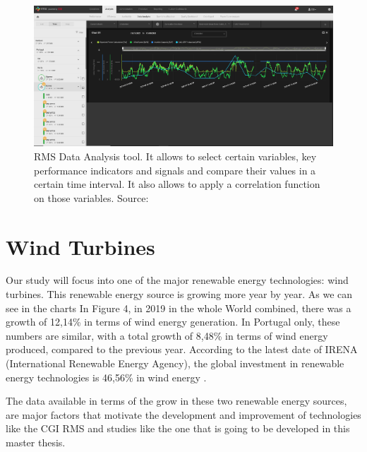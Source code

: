 \begin{figure}[htbp]
	\centering
	\includegraphics[width=\textwidth]{Chapters/Figures/background_fig3.PNG}
	\caption{RMS Data Analysis tool. It allows to select certain variables, key performance indicators and signals and compare their values in a certain time interval. It also allows to apply a correlation function on those variables. Source: \cite{CGIRMS} }
	\label{fig:Figuras_Tree_silhouettes-vectorial}
\end{figure}


\section{Wind Turbines} 
\label{sub:if_you_use_this_template} 

Our study will focus into one of the major renewable energy technologies: wind turbines. This renewable energy source is growing more year by year. As we can see in the charts In Figure 4, in 2019 in the whole World combined, there was a growth of 12,14\% in terms of wind energy generation. In Portugal only, these numbers are similar, with a total growth of 8,48\% in terms of wind energy produced, compared to the previous year. According to the latest date of IRENA (International Renewable Energy Agency), the global investment in renewable energy technologies is 46,56\% in wind energy \cite{OLD_33_GENERAL}.

The data available in terms of the grow in these two renewable energy sources, are major factors that motivate the development and improvement of technologies like the CGI RMS and studies like the one that is going to be developed in this master thesis.


